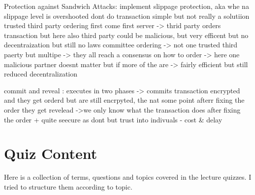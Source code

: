 \documentclass{article}
\begin{document}
Protection against Sandwich Attacks:
implement slippage protection, aka whe na slippage level is overshooted dont do transaction 
simple but not really a solutiion
trusted third party ordering
    first come first server -> thrid party orders transaction but here also third party could be malicious, but very efficent but no decentraization but still no laws 
committee ordering -> not one trusted third paerty but multipe -> they all reach a consensus on how to order -> here one malicious partner doesnt matter but if more of the are -> fairly efficient but still reduced decentralization

commit and reveal : executes in two phases -> commits transaction encrypted and they get orderd but are still encrpyted, the nat some point afterr fixing the order they get revelead ->we only know what the transaction does after fixing the order
+ quite seecure as dont but trust into indivuals
- cost & delay 







\section{Quiz Content}
Here is a collection of terms, questions and topics covered in the lecture quizzes. I tried to structure them according to topic.
\end{document}
